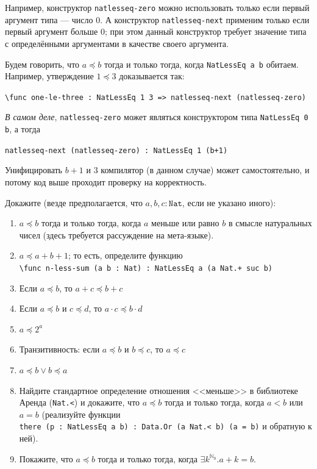 \documentclass[10pt,a4paper,oneside]{article}
\begin{document}
\begin{enumerate}
Например, конструктор \verb!natlesseq-zero! можно использовать только если первый аргумент типа --- число 0.
А конструктор \verb!natlesseq-next! применим только если первый аргумент больше 0; при этом данный конструктор
требует значение типа с определёнными аргументами в качестве своего аргумента.

Будем говорить, что $a \preceq b$ тогда и только тогда, когда \verb!NatLessEq a b! обитаем.
Например, утверждение $1 \preceq 3$ доказывается так:

\begin{center}\verb!\func one-le-three : NatLessEq 1 3 => natlesseq-next (natlesseq-zero)!\end{center}

\emph{В самом деле}, \verb!natlesseq-zero! может являться конструктором типа \verb!NatLessEq 0 b!,
а тогда \begin{center}\verb!natlesseq-next (natlesseq-zero) : NatLessEq 1 (b+1)!\end{center} Унифицировать $b+1$ и $3$
компилятор (в данном случае) может самостоятельно, и потому код выше проходит проверку на корректность.

Докажите (везде предполагается, что $a,b,c : \texttt{Nat}$, если не указано иного):
\begin{enumerate}
\item $a \preceq b$ тогда и только тогда, когда $a$ меньше или равно $b$ в смысле натуральных чисел (здесь требуется рассуждение
на мета-языке).
\item $a \preceq a + b + 1$; то есть, определите функцию\\\verb!\func n-less-sum (a b : Nat) : NatLessEq a (a Nat.+ suc b)!
\item Если $a \preceq b$, то $a + c \preceq b + c$
\item Если $a \preceq b$ и $c \preceq d$, то $a \cdot c \preceq b \cdot d$
\item $a \preceq 2^a$
\item Транзитивность: если $a \preceq b$ и $b \preceq c$, то $a \preceq c$
\item $a \preceq b \vee b \preceq a$
\item Найдите стандартное определение отношения <<меньше>> в библиотеке Аренда (\verb!Nat.<!) и докажите, что $a \preceq b$ 
тогда и только тогда, когда $a < b$ или $a = b$ (реализуйте функции \\\verb!there (p : NatLessEq a b) : Data.Or (a Nat.< b) (a = b)!
и обратную к ней).
\item Покажите, что $a \preceq b$ тогда и только тогда, когда $\exists k^{\mathbb{N}_0}.a + k = b$.
\end{enumerate}


\end{enumerate}
\end{document}

